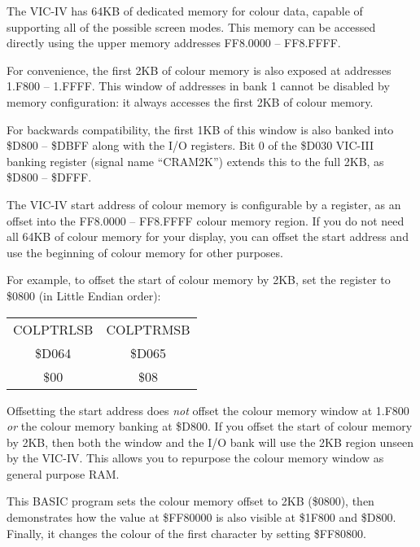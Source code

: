 The VIC-IV has 64KB of dedicated memory for colour data, capable of supporting
all of the possible screen modes. This memory can be accessed directly using
the upper memory addresses FF8.0000 -- FF8.FFFF.


For convenience, the first 2KB of colour memory is
also exposed at addresses 1.F800 -- 1.FFFF. This window of addresses in bank 1
cannot be disabled by memory configuration: it always accesses the first 2KB of
colour memory.

For backwards compatibility, the first 1KB of this window is also banked
into \$D800 -- \$DBFF along with the I/O registers. Bit 0 of the \$D030 VIC-III
banking register (signal name ``CRAM2K'') extends this to the full 2KB, as \$D800
-- \$DFFF.

The VIC-IV start address of colour memory is configurable by a register, as an
offset into the FF8.0000 -- FF8.FFFF colour memory region. If you do not need
all 64KB of colour memory for your display, you can offset the start address
and use the beginning of colour memory for other purposes.

For example, to offset the start of colour memory by 2KB, set the register to
\$0800 (in Little Endian order):

\begin{center}
\begin{tabular}{|c|c|}
\hline
COLPTRLSB & COLPTRMSB \\
\$D064 & \$D065 \\
\hline
\$00 & \$08 \\
\hline
\end{tabular}
\end{center}

Offsetting the start address does {\em not} offset the colour memory window at 1.F800
{\em or} the colour memory banking at \$D800. If you offset the start of colour
memory by 2KB, then both the window and the I/O bank will use the 2KB region
unseen by the VIC-IV. This allows you to repurpose the colour memory window as
general purpose RAM.

This BASIC program sets the colour memory offset to 2KB (\$0800), then
demonstrates how the value at \$FF80000 is also visible at \$1F800 and \$D800.
Finally, it changes the colour of the first character by setting \$FF80800.



